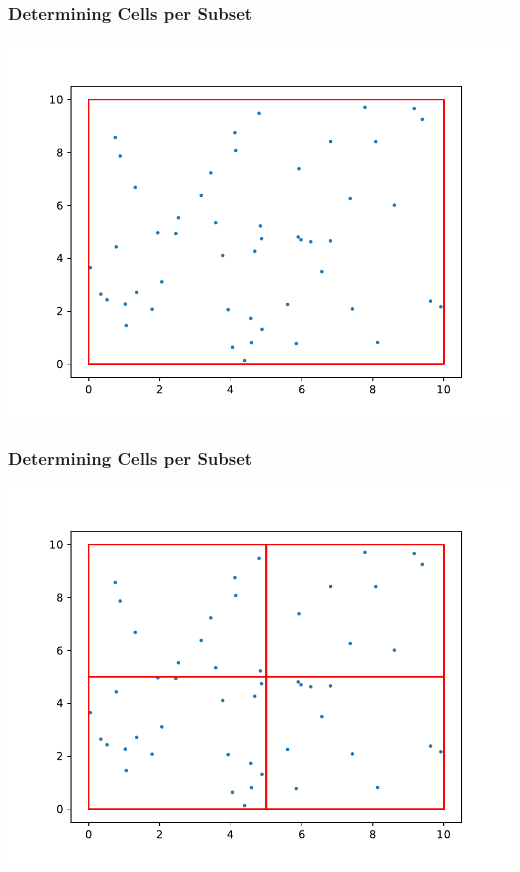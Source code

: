 \documentclass[xcolor={usenames,dvipsnames,svgnames,table}]{beamer}
\begin{document}
\begin{frame}[t]\frametitle{Determining Cells per Subset}
	\centering
	\includegraphics[scale=0.65]{figures/mesh_points.pdf}
\end{frame}

\begin{frame}[t]\frametitle{Determining Cells per Subset}
	\centering
	\includegraphics[scale=0.65]{figures/mesh_subsets.pdf}
\end{frame}
\end{document}
